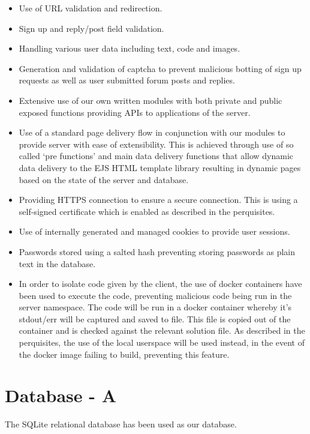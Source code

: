 \documentclass[a4paper]{article}
\begin{document}
\begin{itemize}
  \item{Use of URL validation and redirection.}
  \item{Sign up and reply/post field validation.}
  \item{Handling various user data including text, code and images.}
  \item{Generation and validation of captcha to prevent malicious botting of
    sign up requests as well as user submitted forum posts and replies.}
  \item{Extensive use of our own written modules with both private and public exposed
    functions providing APIs to applications of the server.}
  \item{Use of a standard page delivery flow in conjunction with our modules to
    provide server with ease of extensibility. This is achieved through use of
    so called `pre functions' and main data delivery functions that allow
    dynamic data delivery to the EJS HTML template library resulting in
    dynamic pages based on the state of the server and database.}
  \item{Providing HTTPS connection to ensure a secure connection. This is using
    a self-signed certificate which is enabled as described in the perquisites.}
  \item{Use of internally generated and managed cookies to provide user
    sessions.}
  \item{Passwords stored using a salted hash preventing storing passwords as
    plain text in the database.}
  \item{In order to isolate code given by the client, the use of docker
    containers have been used to execute the code, preventing malicious code being
    run in the server namespace. The code will be run in a docker container
    whereby it's stdout/err will be captured and saved to file. This file is
    copied out of the container and is checked against the relevant solution
    file. As described in the perquisites, the use of the local userspace will
    be used instead, in the event of the docker image failing to build, preventing this
    feature.}
\end{itemize}

\section{Database - A}
The SQLite relational database has been used as our database.
\end{document}
